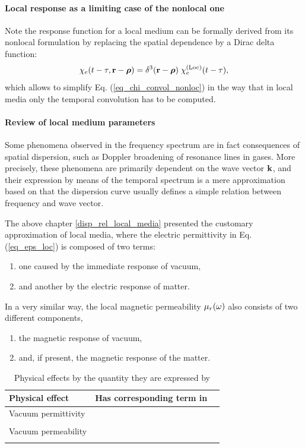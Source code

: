 \paragraph{Local response as a limiting case of the nonlocal one} %
Note the response function for a local medium can be formally derived from its nonlocal formulation by replacing the spatial dependence by a Dirac delta function: %
\begin{equation} \chi_e(t-\tau, {\mathbf{r}}-\boldsymbol{\rho}) = \delta^{3}({\mathbf{r}}-\boldsymbol{\rho}) \; \chi_e^{\rm(Loc)}(t-\tau), \label{eq_loc_chi}\end{equation}
which allows to simplify Eq. (\ref{eq_chi_convol_nonloc}) in the way that in local media only the temporal convolution has to be computed.

\paragraph{Review of local medium parameters}%
Some phenomena observed in the frequency spectrum are in fact consequences of spatial dispersion, such as Doppler broadening of resonance lines in gases.\cite[p. 359]{landau1984electrodynamics} More precisely, these phenomena are primarily dependent on the wave vector ${\mathbf{k}}$, and their expression by means of the temporal spectrum is a mere approximation based on that the dispersion curve usually defines a simple relation between  frequency and wave vector. 

The above chapter \ref{disp_rel_local_media} presented the customary approximation of local media, where the electric permittivity in Eq. (\ref{eq_eps_loc}) is composed of two terms: 
\begin{enumerate}
 \item{one caused  by the immediate response of vacuum,} 
 \item{and another by the electric response of matter.}
 \end{enumerate}
In a very similar way, the local magnetic permeability $\mu_r(\omega)$ also consists of two different components, 
\begin{enumerate}[resume]
 \item{the magnetic response of vacuum,} 
 \item{and, if present, the magnetic response of the matter.} 
\end{enumerate}
\begin{table}[ht]   \caption{Physical effects by the quantity they are expressed by}  \label{tb_nonlocaleff} \centering 
\begin{tabular}{lcr}
 \toprule
Physical effect & Has corresponding term in \\
 \hline
Vacuum permittivity &	&	\\
 &	&	\\
Vacuum permeability &	&	\\
 &	&	\\
 \bottomrule
 \end{tabular} \end{table}


